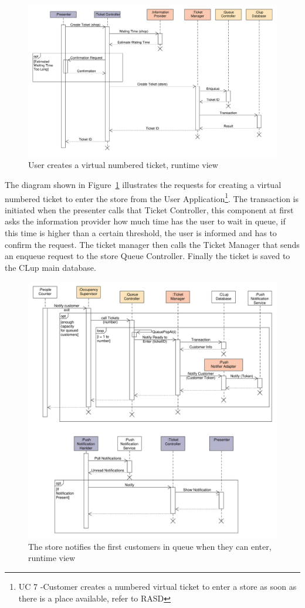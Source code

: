 \begin{figure}[H]
    \includegraphics[width=\textwidth]{Images/UML_virtual_ticket_sequence.pdf}
    \caption{\label{fig:UML_virtual_ticket_sequence}User creates a virtual numbered ticket, runtime view}
\end{figure}
The diagram shown in Figure~\ref{fig:UML_virtual_ticket_sequence} illustrates the requests for creating a virtual numbered ticket to enter the store from the User Application\footnote{UC 7 -Customer creates a numbered virtual ticket to enter a store as soon as there is a place available, refer to RASD}. The transaction is initiated when the presenter calls that Ticket Controller, this component at first asks the information provider how much time has the user to wait in queue, if this time is higher than a certain threshold, the user is informed and has to confirm the request. The ticket manager then calls the Ticket Manager that sends an enqueue request to the store Queue Controller. Finally the ticket is saved to the CLup main database.
\begin{figure}[H]
    \includegraphics[width=\textwidth]{Images/UML_notification_sequence.pdf}
    \caption{\label{fig:UML_notification_sequence}The store notifies the first customers in queue when they can enter, runtime view}
\end{figure}
